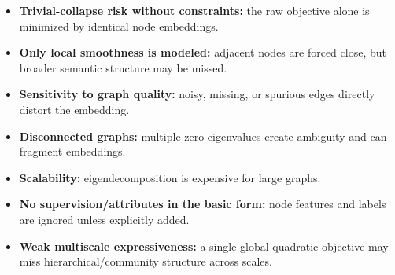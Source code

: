 \documentclass[11pt]{article}
\begin{document}
\begin{itemize}[leftmargin=1.2em]
\item \textbf{Trivial-collapse risk without constraints:} the raw objective alone is minimized by identical node embeddings.
\item \textbf{Only local smoothness is modeled:} adjacent nodes are forced close, but broader semantic structure may be missed.
\item \textbf{Sensitivity to graph quality:} noisy, missing, or spurious edges directly distort the embedding.
\item \textbf{Disconnected graphs:} multiple zero eigenvalues create ambiguity and can fragment embeddings.
\item \textbf{Scalability:} eigendecomposition is expensive for large graphs.
\item \textbf{No supervision/attributes in the basic form:} node features and labels are ignored unless explicitly added.
\item \textbf{Weak multiscale expressiveness:} a single global quadratic objective may miss hierarchical/community structure across scales.
\end{itemize}
\end{document}
